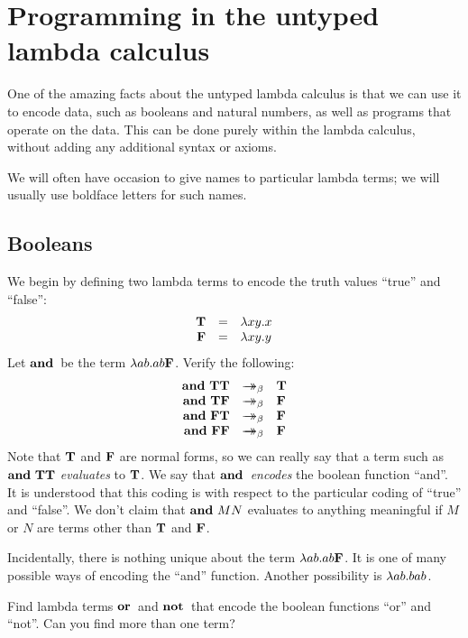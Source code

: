 \documentclass{article}
\begin{document}
\section{Programming in the untyped lambda calculus}

One of the amazing facts about the untyped lambda calculus is that we
can use it to encode data, such as booleans and natural numbers, as well as
programs that operate on the data. This can be done purely within the
lambda calculus, without adding any additional syntax or axioms.

We will often have occasion to give names to particular lambda terms;
we will usually use boldface letters for such names.

\subsection{Booleans}\label{ssec-booleans}

We begin by defining two lambda terms to encode the truth values
``true'' and ``false'':
\[ \begin{array}{rcl}
  {\bf T} &=& \lambda xy.x \\
  {\bf F} &=& \lambda xy.y
\end{array}
\]
Let $\mathop{\textbf{\bf and}\,}$ be the term $\lambda ab.ab{\bf F}$. Verify the following:
\[ \begin{array}{rcl}
  \andt \truet \truet &\redbs& \truet \\
  \andt \truet \falset &\redbs& \falset \\
  \andt \falset \truet &\redbs& \falset \\
  \andt \falset \falset &\redbs& \falset
\end{array}
\]
Note that ${\bf T}$ and ${\bf F}$ are normal forms, so we can really
say that a term such as $\mathop{\textbf{\bf and}\,} {\bf T} {\bf T}$ {\em evaluates} to
${\bf T}$. We say that $\mathop{\textbf{\bf and}\,}$ {\em encodes} the boolean function
``and''. It is understood that this coding is with respect to the
particular coding of ``true'' and ``false''. We don't claim that
$\mathop{\textbf{\bf and}\,} MN$ evaluates to anything meaningful if $M$ or $N$ are terms
other than ${\bf T}$ and ${\bf F}$.

Incidentally, there is nothing unique about the term $\lambda
ab.ab{\bf F}$. It is one of many possible ways of encoding the ``and''
function. Another possibility is $\lambda ab.bab$.

\begin{exercise}
  Find lambda terms $\mathop{\textbf{\bf or}\,}$ and $\mathop{\textbf{\bf not}\,}$ that encode the boolean
  functions ``or'' and ``not''. Can you find more than one term?
\end{exercise}
\end{document}
